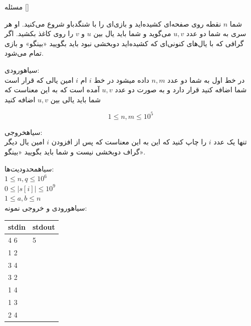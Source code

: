 

‌مسئله []

شما $n$ نقطه روی صفحه‌ای کشیده‌اید و بازی‌ای را با شنگدباو شروع می‌کنید. او هر سری به شما دو عدد $u,v$ می‌گوید و شما باید یال بین $u$ و $v$ را روی کاغذ بکشید. اگر گرافی که با یال‌های کنونی‌ای که کشیده‌اید دوبخشی نبود باید بگویید «بینگو» و بازی تمام می‌شود.

‌سیاه{ورودی:}\\
در خط اول به شما دو عدد $n , m$ داده میشود در خط $i$ ام $i$ امین یالی که قرار است شما اضافه کنید قرار دارد
و به صورت دو عدد $u , v$ آمده است که به این معناست که شما باید یالی بین $u , v$  اضافه کنید

$$1 \le n, m \le 10^5$$

‌سیاه{خروجی:}\\
تنها یک عدد $i$ را چاپ کنید که این به این معناست که پس از افزودن $i$ امین یال دیگر گراف دوبخشی نیست و شما باید بگویید «بینگو».

‌سیاه{محدودیت‌ها:}\\
$1 \leq n, q \leq 10^{6}$\\
$0 \leq |s[i]| \leq 10^{9}$\\
$1 \leq a, b \leq n$\\

‌سیاه{ورودی و خروجی نمونه:}\\

\begin{latin}
	\begin{tabularx}{\textwidth}{|X | X|}
		\hline
		\textbf{stdin} &
		\textbf{stdout}\\
		\hline
		4 6 & 5\\
		1 2 &\\
		3 4 &\\
		3 2 &\\
		1 4 & \\
		1 3&\\
		2 4&\\
		\hline
	\end{tabularx}
\end{latin}

